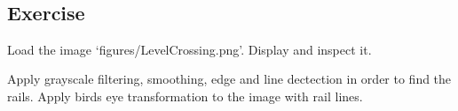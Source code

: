 \documentclass[11pt,a4paper, d]{scrartcl}
\makeatletter
\newcommand{\boxspacing}{\kern\kvtcb@left@rule\kern\kvtcb@boxsep}
\newcommand{\prompt}[4]{
        {\ttfamily\llap{{\color{#2}[#3]:\hspace{3pt}#4}}\vspace{-\baselineskip}}
    }
\makeatother
\begin{document}
    \begin{center}
    \end{center}
    { \hspace*{\fill} \\}
    
    \hypertarget{exercise}{%
\subsection{Exercise}\label{exercise}}

Load the image `figures/LevelCrossing.png'. Display and inspect it.

Apply grayscale filtering, smoothing, edge and line dectection in order
to find the rails. Apply birds eye transformation to the image with rail
lines.

    \begin{tcolorbox}[breakable, size=fbox, boxrule=1pt, pad at break*=1mm,colback=cellbackground, colframe=cellborder]
\prompt{In}{incolor}{ }{\boxspacing}
\begin{Verbatim}[commandchars=\\\{\}]

\end{Verbatim}
\end{tcolorbox}


    
    
    
\end{document}

